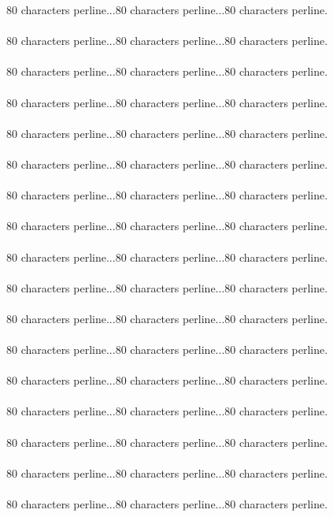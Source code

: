 {{{{
80 characters perline...80 characters perline...80 characters perline.\asdf\\\\
80 characters perline...80 characters perline...80 characters perline.\asdf\\\\
80 characters perline...80 characters perline...80 characters perline.\asdf\\\\
80 characters perline...80 characters perline...80 characters perline.\asdf\\\\
80 characters perline...80 characters perline...80 characters perline.\asdf\\\\
80 characters perline...80 characters perline...80 characters perline.\asdf\\\\
80 characters perline...80 characters perline...80 characters perline.\asdf\\\\
80 characters perline...80 characters perline...80 characters perline.\asdf\\\\
80 characters perline...80 characters perline...80 characters perline.\asdf\\\\
80 characters perline...80 characters perline...80 characters perline.\asdf\\\\
80 characters perline...80 characters perline...80 characters perline.\asdf\\\\
80 characters perline...80 characters perline...80 characters perline.\asdf\\\\
80 characters perline...80 characters perline...80 characters perline.\asdf\\\\
80 characters perline...80 characters perline...80 characters perline.\asdf\\\\
80 characters perline...80 characters perline...80 characters perline.\asdf\\\\
80 characters perline...80 characters perline...80 characters perline.\asdf\\\\
80 characters perline...80 characters perline...80 characters perline.\asdf\\\\
}}}}
